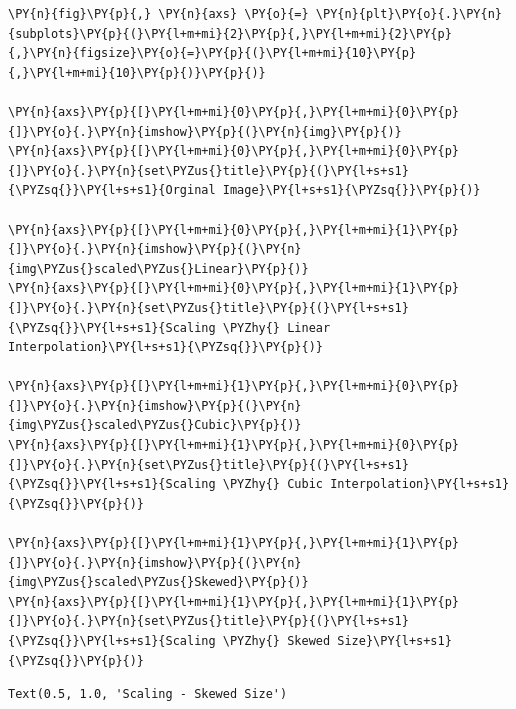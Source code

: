 \begin{tcolorbox}[breakable, size=fbox, boxrule=1pt, pad at break*=1mm,colback=cellbackground, colframe=cellborder]
	\begin{Verbatim}[commandchars=\\\{\}]
\PY{n}{fig}\PY{p}{,} \PY{n}{axs} \PY{o}{=} \PY{n}{plt}\PY{o}{.}\PY{n}{subplots}\PY{p}{(}\PY{l+m+mi}{2}\PY{p}{,}\PY{l+m+mi}{2}\PY{p}{,}\PY{n}{figsize}\PY{o}{=}\PY{p}{(}\PY{l+m+mi}{10}\PY{p}{,}\PY{l+m+mi}{10}\PY{p}{)}\PY{p}{)}

\PY{n}{axs}\PY{p}{[}\PY{l+m+mi}{0}\PY{p}{,}\PY{l+m+mi}{0}\PY{p}{]}\PY{o}{.}\PY{n}{imshow}\PY{p}{(}\PY{n}{img}\PY{p}{)}
\PY{n}{axs}\PY{p}{[}\PY{l+m+mi}{0}\PY{p}{,}\PY{l+m+mi}{0}\PY{p}{]}\PY{o}{.}\PY{n}{set\PYZus{}title}\PY{p}{(}\PY{l+s+s1}{\PYZsq{}}\PY{l+s+s1}{Orginal Image}\PY{l+s+s1}{\PYZsq{}}\PY{p}{)}

\PY{n}{axs}\PY{p}{[}\PY{l+m+mi}{0}\PY{p}{,}\PY{l+m+mi}{1}\PY{p}{]}\PY{o}{.}\PY{n}{imshow}\PY{p}{(}\PY{n}{img\PYZus{}scaled\PYZus{}Linear}\PY{p}{)}
\PY{n}{axs}\PY{p}{[}\PY{l+m+mi}{0}\PY{p}{,}\PY{l+m+mi}{1}\PY{p}{]}\PY{o}{.}\PY{n}{set\PYZus{}title}\PY{p}{(}\PY{l+s+s1}{\PYZsq{}}\PY{l+s+s1}{Scaling \PYZhy{} Linear Interpolation}\PY{l+s+s1}{\PYZsq{}}\PY{p}{)}

\PY{n}{axs}\PY{p}{[}\PY{l+m+mi}{1}\PY{p}{,}\PY{l+m+mi}{0}\PY{p}{]}\PY{o}{.}\PY{n}{imshow}\PY{p}{(}\PY{n}{img\PYZus{}scaled\PYZus{}Cubic}\PY{p}{)}
\PY{n}{axs}\PY{p}{[}\PY{l+m+mi}{1}\PY{p}{,}\PY{l+m+mi}{0}\PY{p}{]}\PY{o}{.}\PY{n}{set\PYZus{}title}\PY{p}{(}\PY{l+s+s1}{\PYZsq{}}\PY{l+s+s1}{Scaling \PYZhy{} Cubic Interpolation}\PY{l+s+s1}{\PYZsq{}}\PY{p}{)}

\PY{n}{axs}\PY{p}{[}\PY{l+m+mi}{1}\PY{p}{,}\PY{l+m+mi}{1}\PY{p}{]}\PY{o}{.}\PY{n}{imshow}\PY{p}{(}\PY{n}{img\PYZus{}scaled\PYZus{}Skewed}\PY{p}{)}
\PY{n}{axs}\PY{p}{[}\PY{l+m+mi}{1}\PY{p}{,}\PY{l+m+mi}{1}\PY{p}{]}\PY{o}{.}\PY{n}{set\PYZus{}title}\PY{p}{(}\PY{l+s+s1}{\PYZsq{}}\PY{l+s+s1}{Scaling \PYZhy{} Skewed Size}\PY{l+s+s1}{\PYZsq{}}\PY{p}{)}
	\end{Verbatim}
\end{tcolorbox}

\begin{tcolorbox}[breakable, size=fbox, boxrule=.5pt, pad at break*=1mm, opacityfill=0]
	\begin{Verbatim}[commandchars=\\\{\}]
Text(0.5, 1.0, 'Scaling - Skewed Size')
	\end{Verbatim}
\end{tcolorbox}

